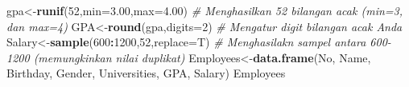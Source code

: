 \documentclass[
]{book}
\newenvironment{Shaded}{\begin{snugshade}}{\end{snugshade}}
\newcommand{\AttributeTok}[1]{\textcolor[rgb]{0.13,0.29,0.53}{#1}}
\newcommand{\CommentTok}[1]{\textcolor[rgb]{0.56,0.35,0.01}{\textit{#1}}}
\newcommand{\DecValTok}[1]{\textcolor[rgb]{0.00,0.00,0.81}{#1}}
\newcommand{\FloatTok}[1]{\textcolor[rgb]{0.00,0.00,0.81}{#1}}
\newcommand{\FunctionTok}[1]{\textcolor[rgb]{0.13,0.29,0.53}{\textbf{#1}}}
\newcommand{\NormalTok}[1]{#1}
\newcommand{\OtherTok}[1]{\textcolor[rgb]{0.56,0.35,0.01}{#1}}
\newcommand{\SpecialCharTok}[1]{\textcolor[rgb]{0.81,0.36,0.00}{\textbf{#1}}}
\begin{document}
\begin{Shaded}
\begin{Highlighting}[]
\NormalTok{gpa}\OtherTok{\textless{}{-}}\FunctionTok{runif}\NormalTok{(}\DecValTok{52}\NormalTok{,}\AttributeTok{min=}\FloatTok{3.00}\NormalTok{,}\AttributeTok{max=}\FloatTok{4.00}\NormalTok{)                 }\CommentTok{\# Menghasilkan 52 bilangan acak (min=3, dan max=4) }
\NormalTok{GPA}\OtherTok{\textless{}{-}}\FunctionTok{round}\NormalTok{(gpa,}\AttributeTok{digits=}\DecValTok{2}\NormalTok{)                         }\CommentTok{\# Mengatur digit bilangan acak Anda}
\NormalTok{Salary}\OtherTok{\textless{}{-}}\FunctionTok{sample}\NormalTok{(}\DecValTok{600}\SpecialCharTok{:}\DecValTok{1200}\NormalTok{,}\DecValTok{52}\NormalTok{,}\AttributeTok{replace=}\NormalTok{T)            }\CommentTok{\# Menghasilakn sampel antara 600{-}1200 (memungkinkan nilai duplikat)}
\NormalTok{Employees}\OtherTok{\textless{}{-}}\FunctionTok{data.frame}\NormalTok{(No,}
\NormalTok{                      Name,}
\NormalTok{                      Birthday,}
\NormalTok{                      Gender,}
\NormalTok{                      Universities,}
\NormalTok{                      GPA,}
\NormalTok{                      Salary)}
\NormalTok{Employees}
\end{Highlighting}
\end{Shaded}
\end{document}
